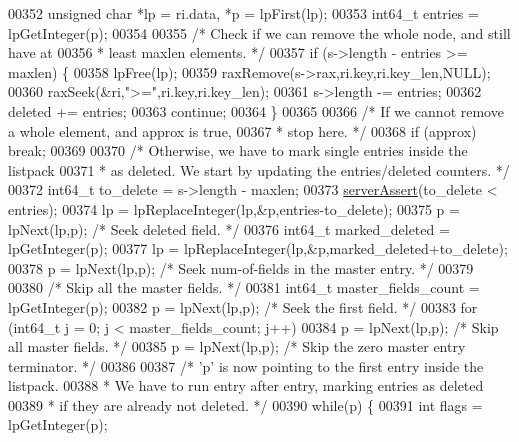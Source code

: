 \begin{DoxyCode}
{00352         \textcolor{keywordtype}{unsigned} \textcolor{keywordtype}{char} *lp = ri.data, *p = lpFirst(lp);
00353         int64\_t entries = lpGetInteger(p);
00354 
00355         \textcolor{comment}{/* Check if we can remove the whole node, and still have at}
00356 \textcolor{comment}{         * least maxlen elements. */}
00357         \textcolor{keywordflow}{if} (s->length - entries >= maxlen) \{
00358             lpFree(lp);
00359             raxRemove(s->rax,ri.key,ri.key\_len,NULL);
00360             raxSeek(&ri,\textcolor{stringliteral}{">="},ri.key,ri.key\_len);
00361             s->length -= entries;
00362             deleted += entries;
00363             \textcolor{keywordflow}{continue};
00364         \}
00365 
00366         \textcolor{comment}{/* If we cannot remove a whole element, and approx is true,}
00367 \textcolor{comment}{         * stop here. */}
00368         \textcolor{keywordflow}{if} (approx) \textcolor{keywordflow}{break};
00369 
00370         \textcolor{comment}{/* Otherwise, we have to mark single entries inside the listpack}
00371 \textcolor{comment}{         * as deleted. We start by updating the entries/deleted counters. */}
00372         int64\_t to\_delete = s->length - maxlen;
00373         \hyperlink{server_8h_a88114b5169b4c382df6b56506285e56a}{serverAssert}(to\_delete < entries);
00374         lp = lpReplaceInteger(lp,&p,entries-to\_delete);
00375         p = lpNext(lp,p); \textcolor{comment}{/* Seek deleted field. */}
00376         int64\_t marked\_deleted = lpGetInteger(p);
00377         lp = lpReplaceInteger(lp,&p,marked\_deleted+to\_delete);
00378         p = lpNext(lp,p); \textcolor{comment}{/* Seek num-of-fields in the master entry. */}
00379 
00380         \textcolor{comment}{/* Skip all the master fields. */}
00381         int64\_t master\_fields\_count = lpGetInteger(p);
00382         p = lpNext(lp,p); \textcolor{comment}{/* Seek the first field. */}
00383         \textcolor{keywordflow}{for} (int64\_t j = 0; j < master\_fields\_count; j++)
00384             p = lpNext(lp,p); \textcolor{comment}{/* Skip all master fields. */}
00385         p = lpNext(lp,p); \textcolor{comment}{/* Skip the zero master entry terminator. */}
00386 
00387         \textcolor{comment}{/* 'p' is now pointing to the first entry inside the listpack.}
00388 \textcolor{comment}{         * We have to run entry after entry, marking entries as deleted}
00389 \textcolor{comment}{         * if they are already not deleted. */}
00390         \textcolor{keywordflow}{while}(p) \{
00391             \textcolor{keywordtype}{int} flags = lpGetInteger(p);
}
\end{DoxyCode}
